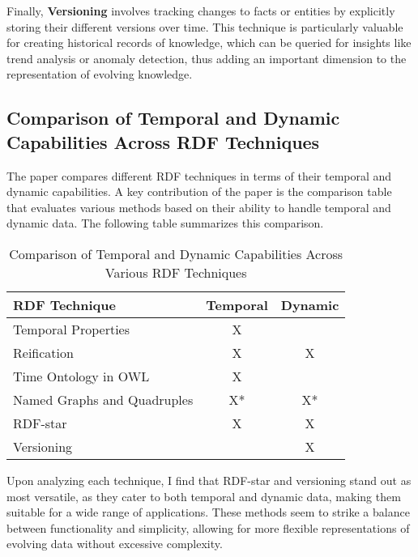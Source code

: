 Finally, \textbf{Versioning} involves tracking changes to facts or entities by explicitly storing their different versions over time. This technique is particularly valuable for creating historical records of knowledge, which can be queried for insights like trend analysis or anomaly detection, thus adding an important dimension to the representation of evolving knowledge.

\subsection{Comparison of Temporal and Dynamic Capabilities Across RDF Techniques}

The paper compares different RDF techniques in terms of their temporal and dynamic capabilities. A key contribution of the paper is the comparison table that evaluates various methods based on their ability to handle temporal and dynamic data. The following table summarizes this comparison.

\begin{table}[h]
    \centering
    \caption{Comparison of Temporal and Dynamic Capabilities Across Various RDF Techniques}
    \begin{tabular}{|l|c|c|}
        \hline
        \textbf{RDF Technique} & \textbf{Temporal} & \textbf{Dynamic} \\ \hline
        Temporal Properties     & X                &                   \\ \hline
        Reification             & X                & X                 \\ \hline
        Time Ontology in OWL    & X                &                   \\ \hline
        Named Graphs and Quadruples      & X* & X*                 \\ \hline
        RDF-star                    & X                & X                 \\ \hline
        Versioning              &                  & X                 \\ \hline
    \end{tabular}
\end{table}

Upon analyzing each technique, I find that RDF-star and versioning stand out as most versatile, as they cater to both temporal and dynamic data, making them suitable for a wide range of applications. These methods seem to strike a balance between functionality and simplicity, allowing for more flexible representations of evolving data without excessive complexity.

